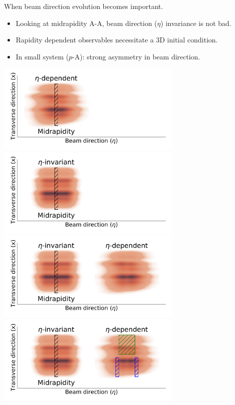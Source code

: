 \documentclass[11pt]{beamer}
\begin{document}
\begin{frame}{When beam direction evolution becomes important.}
\begin{itemize}
\item<1-> Looking at midrapidity A-A, beam direction ($\eta$) invariance is not bad.
\item<3-> Rapidity dependent observables necessitate a 3D initial condition.
\item<5-> In small system ($p$-A): strong asymmetry in beam direction.
\end{itemize}

\begin{overprint}
\includegraphics[width=0.67\textwidth]{nuclei_demo_a.pdf}
\includegraphics[width=0.67\textwidth]{nuclei_demo_b.pdf}
\includegraphics[width=0.67\textwidth]{nuclei_demo_01.pdf}
\includegraphics[width=0.67\textwidth]{nuclei_demo_02.pdf}

\end{overprint}
\end{frame}
\end{document}
